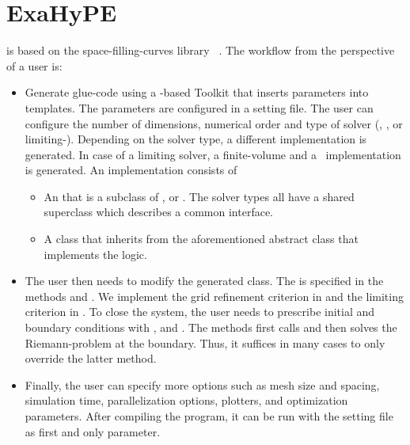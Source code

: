 \section{ExaHyPE}
\exahype{} is based on the space-filling-curves library \peano~\cite{weinzierl2011}.
The workflow from the perspective of a user is:
\begin{itemize}
\item Generate glue-code using a -based Toolkit that inserts parameters into templates.
  The parameters are configured in a setting file.
  The user can configure the number of dimensions, numerical order and type of solver (\aderdg{}, \muscl, or limiting-\aderdg).
  Depending on the solver type, a different implementation is generated.
  In case of a limiting solver, a finite-volume and a \dg\ implementation is generated.
  An implementation consists of
  \begin{itemize}
  \item An  that is a subclass of ,  or .
    The solver types all have a shared superclass  which describes a common interface.
  \item A class that inherits from the aforementioned abstract class that implements the \pde{} logic.
  \end{itemize}
  
\item The user then needs to modify the generated  class.
  The \pde{} is specified in the methods  and .
  We implement the grid refinement criterion in  and the limiting criterion in .
  To close the system, the user needs to prescribe initial and boundary conditions with ,  and .
  The methods  first calls  and then solves the Riemann-problem at the boundary.
  Thus, it suffices in many cases to only override the latter method.
\item Finally, the user can specify more options such as mesh size and spacing, simulation time, parallelization options, plotters, and optimization parameters.
 After compiling the program, it can be run with the setting file as first and only parameter.
\end{itemize}

